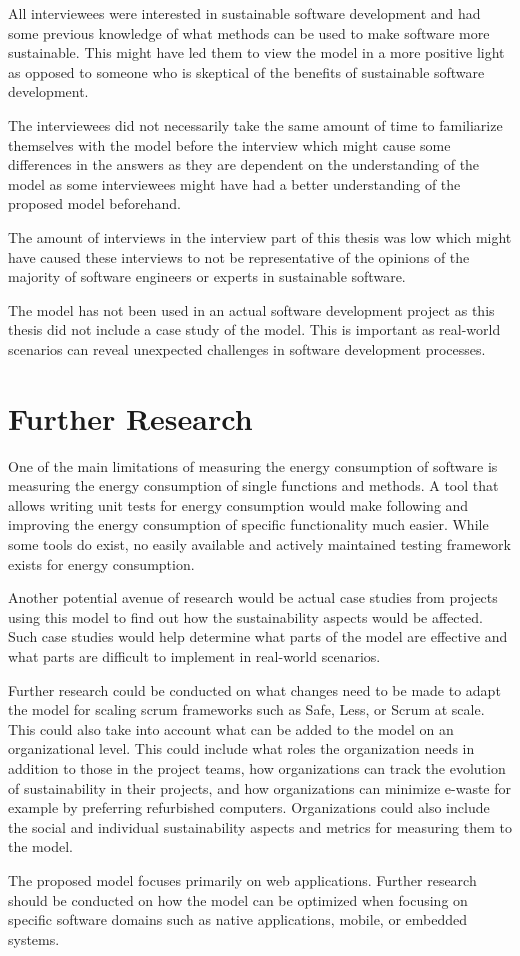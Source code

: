 All interviewees were interested in sustainable software development and had some previous knowledge of what methods can be used to make software more sustainable. This might have led them to view the model in a more positive light as opposed to someone who is skeptical of the benefits of sustainable software development. 

The interviewees did not necessarily take the same amount of time to familiarize themselves with the model before the interview which might cause some differences in the answers as they are dependent on the understanding of the model as some interviewees might have had a better understanding of the proposed model beforehand.

The amount of interviews in the interview part of this thesis was low which might have caused these interviews to not be representative of the opinions of the majority of software engineers or experts in sustainable software.

The model has not been used in an actual software development project as this thesis did not include a case study of the model. This is important as real-world scenarios can reveal unexpected challenges in software development processes.

\section{Further Research}
One of the main limitations of measuring the energy consumption of software is measuring the energy consumption of single functions and methods. A tool that allows writing unit tests for energy consumption would make following and improving the energy consumption of specific functionality much easier. While some tools do exist, no easily available and actively maintained testing framework exists for energy consumption.

Another potential avenue of research would be actual case studies from projects using this model to find out how the sustainability aspects would be affected. Such case studies would help determine what parts of the model are effective and what parts are difficult to implement in real-world scenarios.

Further research could be conducted on what changes need to be made to adapt the model for scaling scrum frameworks such as Safe, Less, or Scrum at scale. This could also take into account what can be added to the model on an organizational level. This could include what roles the organization needs in addition to those in the project teams, how organizations can track the evolution of sustainability in their projects, and how organizations can minimize e-waste for example by preferring refurbished computers. Organizations could also include the social and individual sustainability aspects and metrics for measuring them to the model.

The proposed model focuses primarily on web applications. Further research should be conducted on how the model can be optimized when focusing on specific software domains such as native applications, mobile, or embedded systems.